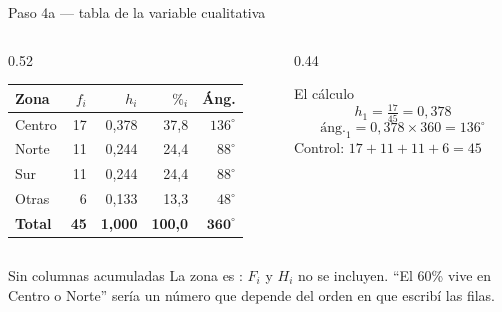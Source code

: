 \documentclass[aspectratio=169,10pt]{beamer}
\begin{document}
\begin{frame}{Paso 4a — tabla de la variable cualitativa}
  \scriptsize
  \begin{columns}[T,onlytextwidth]
    \begin{column}{0.52\textwidth}
      \centering
      \begin{tabular}{@{}lrrrr@{}}
        \toprule
        \textbf{Zona} & \textbf{$f_i$} & \textbf{$h_i$} & \textbf{$\%_i$} &
        \textbf{Áng.} \\
        \midrule
        Centro & 17 & 0{,}378 & 37{,}8 & $136^\circ$ \\
        Norte  & 11 & 0{,}244 & 24{,}4 & $88^\circ$ \\
        Sur    & 11 & 0{,}244 & 24{,}4 & $88^\circ$ \\
        Otras  &  6 & 0{,}133 & 13{,}3 & $48^\circ$ \\
        \midrule
        \textbf{Total} & \textbf{45} & \textbf{1{,}000} & \textbf{100{,}0} &
        $\mathbf{360^\circ}$ \\
        \bottomrule
      \end{tabular}
    \end{column}
    \begin{column}{0.44\textwidth}
      \begin{exampleblock}{El cálculo}
        \scriptsize
        \[ h_1 = \tfrac{17}{45} = 0{,}378 \]
        \[ \text{áng.}_1 = 0{,}378 \times 360 = 136^\circ \]
        Control: $17+11+11+6 = 45$ \checkmark
      \end{exampleblock}
    \end{column}
  \end{columns}

  \vspace{0.1cm}
  \begin{alertblock}{Sin columnas acumuladas}
    \scriptsize
    La zona es : $F_i$ y $H_i$ no se incluyen. ``El 60\% vive
    en Centro o Norte'' sería un número que depende del orden en que escribí
    las filas.
  \end{alertblock}
\end{frame}
\end{document}
